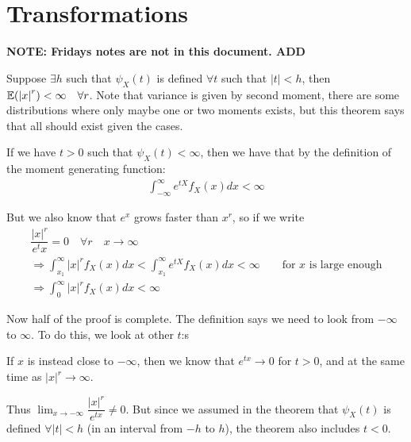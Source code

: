 \section{Transformations}\par
\noindent\textbf{NOTE: Fridays notes are not in this document. ADD}
\par\bigskip
\begin{theo}[]{}
  Suppose $\exists h$ such that $\psi_X(t)$ is defined $\forall t$ such that $\left|t\right|<h$, then $\mathbb{E}(\left|x\right|^r)<\infty\quad\forall r$. Note that variance is given by second moment, there are some distributions where only maybe one or two moments exists, but this theorem says that all should exist given the cases. 
\end{theo}
\par\bigskip
\begin{prf}[]{}
  If we have $t>0$ such that $\psi_X(t)<\infty$, then we have that by the definition of the moment generating function:
  \begin{equation*}
    \begin{gathered}
      \int_{-\infty}^{\infty}e^{tX}f_X(x)dx<\infty
    \end{gathered}
  \end{equation*}
  \par\bigskip
  \noindent But we also know that $e^x$ grows faster than $x^r$, so if we write
  \begin{equation*}
    \begin{gathered}
      \dfrac{\left|x\right|^r}{e^tx} =0\quad \forall r\quad x\to\infty\\
      \Rightarrow \int_{x_1}^{\infty}\left|x\right|^rf_X(x)dx<\int_{x_1}^{\infty}e^{tX}f_X(x)dx<\infty\qquad \text{for $x$ is large enough}\\
      \Rightarrow \int_{0}^{\infty}\left|x\right|^rf_X(x)dx<\infty
    \end{gathered}
  \end{equation*}\par
  \noindent Now half of the proof is complete. The definition says we need to look from $-\infty$ to $\infty$. To do this, we look at other $t$:s
  \par\bigskip
  \noindent If $x$ is instead close to $-\infty$, then we know that $e^{tx}\to0$ for $t>0$, and at the same time as $\left|x\right|^r\to\infty$.\par
  \noindent Thus $\lim_{x\to-\infty}\dfrac{\left|x\right|^r}{e^{tx}}\neq0$. But since we assumed in the theorem that $\psi_X(t)$ is defined $\forall\left|t\right|<h$ (in an interval from $-h$ to $h$), the theorem also includes $t<0$.

\end{prf}
